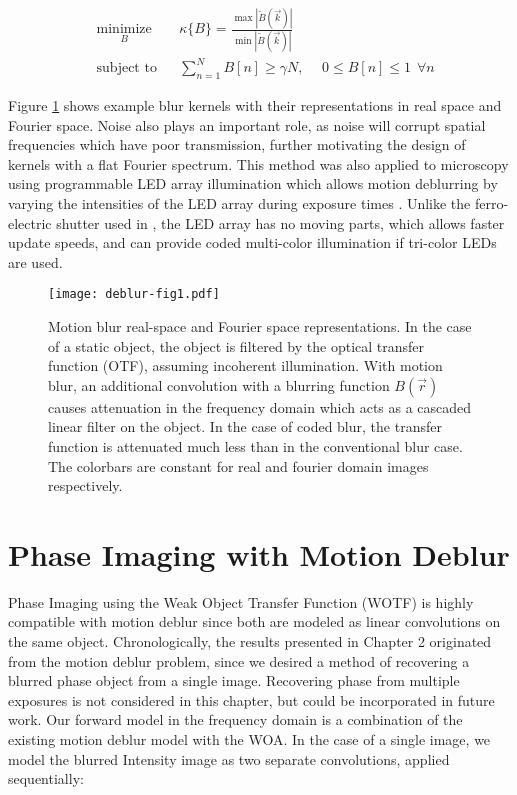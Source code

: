 \begin{equation}
\label{eq:deblurKernelProb}
\begin{aligned}
& \underset{B}{\text{minimize}}
& & \kappa \{ B \} = \frac{\max{|\tilde{B}(\vec{k})|}}{\min{|\tilde{B}(\vec{k})|}} \\
& \text{subject to}
& & \sum_{n=1}^N B[n] \geq \gamma N, \hspace{15pt} 0 \leq B[n] \leq 1 \hspace{5pt} \forall n
\end{aligned}
\end{equation}


Figure \ref{fig:deblur} shows example blur kernels with their representations in real space and Fourier space. Noise also plays an important role, as noise will corrupt spatial frequencies which have poor transmission, further motivating the design of kernels with a flat Fourier spectrum. This method was also applied to microscopy using programmable LED array illumination which allows motion deblurring by varying the intensities of the LED array during exposure times \cite{Ma:15}. Unlike the ferro-electric shutter used in \cite{raskar2006coded}, the LED array has no moving parts, which allows faster update speeds, and can provide coded multi-color illumination if tri-color LEDs are used.


\begin{figure}[ph]
\centering
\texttt{[image: deblur-fig1.pdf]}
\caption{\label{fig:deblur}
Motion blur real-space and Fourier space representations. In the case of a static object, the object is filtered by the optical transfer function (OTF), assuming incoherent illumination. With motion blur, an additional convolution with a blurring function $B(\vec{r})$ causes attenuation in the frequency domain which acts as a cascaded linear filter on the object. In the case of coded blur, the transfer function is attenuated much less than in the conventional blur case. The colorbars are constant for real and fourier domain images respectively.}
\end{figure}

\section{Phase Imaging with Motion Deblur}
Phase Imaging using the Weak Object Transfer Function (WOTF) is highly compatible with motion deblur since both are modeled as linear convolutions on the same object. Chronologically, the results presented in Chapter 2 originated from the motion deblur problem, since we desired a method of recovering a blurred phase object from a single image. Recovering phase from multiple exposures is not considered in this chapter, but could be incorporated in future work. Our forward model in the frequency domain is a combination of the existing motion deblur model with the WOA. In the case of a single image, we model the blurred Intensity image as two separate convolutions, applied sequentially:

